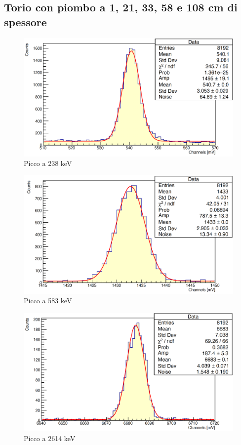 \documentclass[a4paper,10pt]{article}
\begin{document}
\subsection{Torio con piombo a 1, 21, 33, 58 e 108 cm di spessore}
\begin{figure}[H]
    \centering
    \includegraphics[scale=0.45]{appendice/spettri/ThPb1_1}
    \caption{Picco a 238 keV}
\end{figure}
\begin{figure}[H]
    \centering
    \includegraphics[scale=0.45]{appendice/spettri/ThPb2_1}
    \caption{Picco a 583 keV}
\end{figure}
\begin{figure}[H]
    \centering
    \includegraphics[scale=0.45]{appendice/spettri/ThPb3_1}
    \caption{Picco a 2614 keV}
\end{figure}
\end{document}
